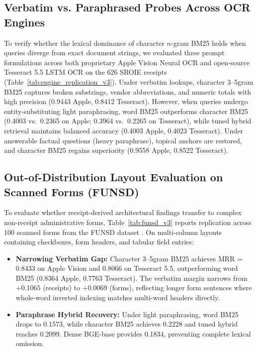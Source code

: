 \documentclass[conference]{IEEEtran}
\begin{document}
\subsection{Verbatim vs. Paraphrased Probes Across OCR Engines}
To verify whether the lexical dominance of character $n$-gram BM25 holds when queries diverge from exact document strings, we evaluated three prompt formulations across both proprietary Apple Vision Neural OCR and open-source Tesseract 5.5 LSTM OCR on the 626 SROIE receipts (Table~\ref{tab:engine_replication_v3}). Under verbatim lookups, character 3--5gram BM25 captures broken substrings, vendor abbreviations, and numeric totals with high precision (0.9443 Apple, 0.8412 Tesseract). However, when queries undergo entity-substituting light paraphrasing, word BM25 outperforms character BM25 (0.4003 vs.\ 0.2365 on Apple; 0.3964 vs.\ 0.2265 on Tesseract), while tuned hybrid retrieval maintains balanced accuracy (0.4003 Apple, 0.4023 Tesseract). Under answerable factual questions (heavy paraphrase), topical anchors are restored, and character BM25 regains superiority (0.9558 Apple, 0.8522 Tesseract).

\subsection{Out-of-Distribution Layout Evaluation on Scanned Forms (FUNSD)}
To evaluate whether receipt-derived architectural findings transfer to complex non-receipt administrative forms, Table~\ref{tab:funsd_v3} reports replication across 100 scanned forms from the FUNSD dataset \cite{jaume2019funsd}. On multi-column layouts containing checkboxes, form headers, and tabular field entries:
\begin{itemize}
    \setlength{\itemsep}{0.2pt plus 0.1pt}
    \setlength{\parskip}{0pt}
    \item \textbf{Narrowing Verbatim Gap:} Character 3--5gram BM25 achieves MRR = 0.8433 on Apple Vision and 0.8066 on Tesseract 5.5, outperforming word BM25 (0.8364 Apple, 0.7763 Tesseract). The verbatim margin narrows from $+0.1065$ (receipts) to $+0.0069$ (forms), reflecting longer form sentences where whole-word inverted indexing matches multi-word headers directly.
    \item \textbf{Paraphrase Hybrid Recovery:} Under light paraphrasing, word BM25 drops to 0.1573, while character BM25 achieves 0.2228 and tuned hybrid reaches 0.2099. Dense BGE-base provides 0.1834, preventing complete lexical omission.
\end{itemize}
\end{document}
